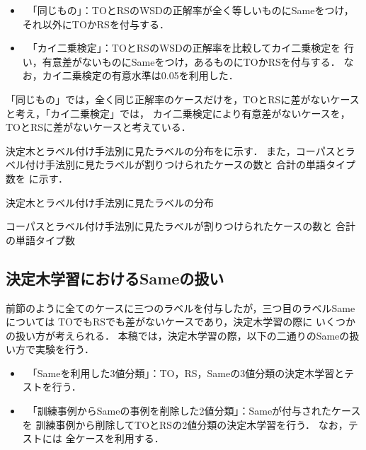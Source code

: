 \documentclass[japanese]{jnlp_1.4}
\newcommand{\tabref}[1]{}
\begin{document}
\begin{itemize}
\item\ 「同じもの」：TOとRSのWSDの正解率が全く等しいものにSameをつけ，
それ以外にTOかRSを付与する．
\item\ 「カイ二乗検定」：TOとRSのWSDの正解率を比較してカイ二乗検定を
行い，有意差がないものにSameをつけ，あるものにTOかRSを付与する．
なお，カイ二乗検定の有意水準は0.05を利用した．
\end{itemize}

「同じもの」では，全く同じ正解率のケースだけを，TOとRSに差がないケースと考え，「カイ二乗検定」では，
カイ二乗検定により有意差がないケースを，TOとRSに差がないケースと考えている．

決定木とラベル付け手法別に見たラベルの分布を\tabref{決定木とラベル付け手法別に見たラベルの分布}に示す．
また，コーパスとラベル付け手法別に見たラベルが割りつけられたケースの数と
合計の単語タイプ数を\tabref{tab:The number of cases} 
に示す．

\begin{table}[t]
\caption{決定木とラベル付け手法別に見たラベルの分布}
\label{決定木とラベル付け手法別に見たラベルの分布}

\end{table}
\begin{table}[t]
\caption{コーパスとラベル付け手法別に見たラベルが割りつけられたケースの数と
合計の単語タイプ数} 
\label{tab:The number of cases}

\end{table}



\subsection{決定木学習におけるSameの扱い}
\label{sec:決定木学習におけるSameの扱い}

前節のように全てのケースに三つのラベルを付与したが，三つ目のラベルSameについては
TOでもRSでも差がないケースであり，決定木学習の際に
いくつかの扱い方が考えられる．
本稿では，決定木学習の際，以下の二通りのSameの扱い方で実験を行う．

\begin{itemize}
\item\ 「Sameを利用した3値分類」：TO，RS，Sameの3値分類の決定木学習とテストを行う．
\item\ 「訓練事例からSameの事例を削除した2値分類」：Sameが付与されたケースを
訓練事例から削除してTOとRSの2値分類の決定木学習を行う．
なお，テストには 全ケースを利用する．
\end{itemize}
\end{document}
